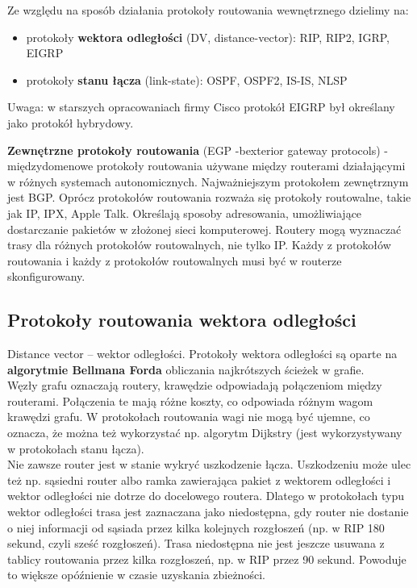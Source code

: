 \documentclass[a4paper]{article}
\begin{document}
Ze względu na sposób działania protokoły routowania wewnętrznego dzielimy na:
\begin{itemize}
    \item protokoły \textbf{wektora odległości} (DV, distance-vector): RIP, RIP2, IGRP, EIGRP
    \item protokoły \textbf{stanu łącza} (link-state): OSPF, OSPF2, IS-IS, NLSP
\end{itemize}
Uwaga: w starszych opracowaniach firmy Cisco protokół EIGRP był określany jako protokół
hybrydowy.

\textbf{Zewnętrzne protokoły routowania} (EGP -bexterior gateway protocols) - międzydomenowe protokoły routowania używane między routerami działającymi w różnych systemach autonomicznych.
Najważniejszym protokołem zewnętrznym jest BGP.
Oprócz protokołów routowania rozważa się protokoły routowalne, takie jak IP, IPX, Apple
Talk. Określają sposoby adresowania, umożliwiające dostarczanie
pakietów w złożonej sieci komputerowej. Routery mogą wyznaczać trasy dla różnych
protokołów routowalnych, nie tylko IP. Każdy z protokołów routowania i każdy z protokołów
routowalnych musi być w routerze skonfigurowany.

\subsection{Protokoły routowania wektora odległości}
Distance vector – wektor odległości. Protokoły wektora odległości są oparte na \textbf{algorytmie Bellmana Forda} obliczania najkrótszych ścieżek w grafie.\\
Węzły grafu oznaczają routery, krawędzie odpowiadają połączeniom między routerami.
Połączenia te mają różne koszty, co odpowiada różnym wagom krawędzi grafu.
W protokołach routowania wagi nie mogą być ujemne, co oznacza, że można też
wykorzystać np. algorytm Dijkstry (jest wykorzystywany w protokołach stanu łącza).\\

Nie zawsze router jest w stanie wykryć uszkodzenie łącza. Uszkodzeniu
może ulec też np. sąsiedni router albo ramka zawierająca pakiet z wektorem odległości i wektor
odległości nie dotrze do docelowego routera. Dlatego w protokołach typu wektor odległości
trasa jest zaznaczana jako niedostępna, gdy router nie dostanie o niej informacji od sąsiada
przez kilka kolejnych rozgłoszeń (np. w RIP 180 sekund, czyli sześć
rozgłoszeń). Trasa niedostępna nie jest jeszcze usuwana z tablicy routowania przez
kilka rozgłoszeń, np. w RIP przez 90 sekund. Powoduje to większe opóźnienie w czasie uzyskania zbieżności.\\
\end{document}
